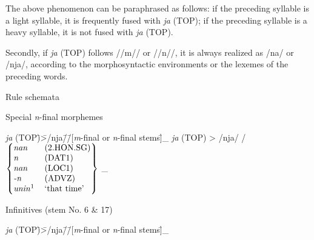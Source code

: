 The above phenomenon can be paraphrased as follows: if the preceding syllable is a light syllable, it is frequently fused with \textit{ja} (TOP); if the preceding syllable is a heavy syllable, it is not fused with \textit{ja} (TOP).

  Secondly, if \textit{ja} (TOP) follows //m// or //n//, it is always realized as /na/ or /nja/, according to the morphosyntactic environments or the lexemes of the preceding words.

\begin{exe}
\ex Rule schemata\label{ex:10.3}
  \begin{xlist}
  \ex  Special \textit{n}{}-final morphemes
    \begin{tabbing}
    \textit{ja} (TOP)\hspace{\tabcolsep}\=\hspace{\tabcolsep}>\hspace{\tabcolsep}\=\hspace{\tabcolsep}/nja/\hspace{\tabcolsep}\=\hspace{\tabcolsep}/\hspace{\tabcolsep}\=\hspace{\tabcolsep}[\textit{m}{}-final or \textit{n}{}-final stems]\hspace{\tabcolsep}\=\hspace{\tabcolsep}\_\kill 
    \textit{ja} (TOP) \> > \> /nja/ \> / \> $\left\{\begin{tabular}{@{}ll@{}} 
                                             \textit{nan}                  & (2.HON.SG)\\   
                                             \textit{n}                    & (DAT1)\\
                                             \textit{nan}                  & (LOC1)\\
                                             \textit{{}-n}                 & (ADVZ)\\
                                             \textit{unin}\footnotemark{}  & ‘that time’\\
                                             \end{tabular}\right\}$ \> \_\\
    \end{tabbing}
    \ex Infinitives (stem No. 6 \& 17)
    \begin{tabbing}
    \textit{ja} (TOP)\hspace{\tabcolsep}\=\hspace{\tabcolsep}>\hspace{\tabcolsep}\=\hspace{\tabcolsep}/nja/\hspace{\tabcolsep}\=\hspace{\tabcolsep}/\hspace{\tabcolsep}\=\hspace{\tabcolsep}[\textit{m}{}-final or \textit{n}{}-final stems]\hspace{\tabcolsep}\=\hspace{\tabcolsep}\_\kill 

\end{tabbing}
\end{xlist}
\end{exe}
